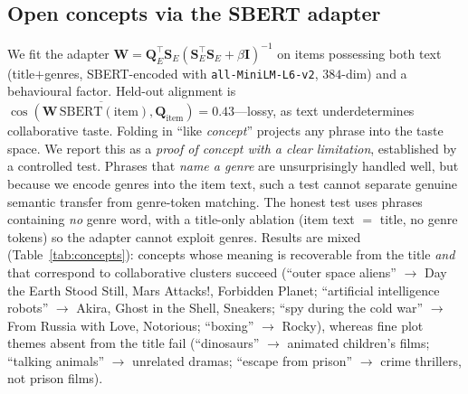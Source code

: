 \documentclass[11pt]{article}
\newcommand{\Q}{\mathbf{Q}}
\newcommand{\W}{\mathbf{W}}
\newcommand{\I}{\mathbf{I}}
\begin{document}
\subsection{Open concepts via the SBERT adapter}\label{sec:concepts}
We fit the adapter $\W=\Q_E^\top\mathbf S_E(\mathbf S_E^\top\mathbf S_E+\beta\I)^{-1}$ on items possessing both
text (title$+$genres, SBERT-encoded with \texttt{all-MiniLM-L6-v2}, $384$-dim) and a behavioural factor. Held-out
alignment is $\overline{\cos(\W\,\mathrm{SBERT}(\text{item}),\Q_{\text{item}})}=0.43$---lossy, as text
underdetermines collaborative taste. Folding in ``like \emph{concept}'' projects any phrase into the taste space.
We report this as a \emph{proof of concept with a clear limitation}, established by a controlled test. Phrases that
\emph{name a genre} are unsurprisingly handled well, but because we encode genres into the item text, such a test
cannot separate genuine semantic transfer from genre-token matching. The honest test uses phrases containing
\emph{no} genre word, with a title-only ablation (item text $=$ title, no genre tokens) so the adapter cannot
exploit genres. Results are mixed (Table~\ref{tab:concepts}): concepts whose meaning is recoverable from the title
\emph{and} that correspond to collaborative clusters succeed (``outer space aliens'' $\to$ Day the Earth Stood
Still, Mars Attacks!, Forbidden Planet; ``artificial intelligence robots'' $\to$ Akira, Ghost in the Shell,
Sneakers; ``spy during the cold war'' $\to$ From Russia with Love, Notorious; ``boxing'' $\to$ Rocky), whereas fine
plot themes absent from the title fail (``dinosaurs'' $\to$ animated children's films; ``talking animals'' $\to$
unrelated dramas; ``escape from prison'' $\to$ crime thrillers, not prison films).
\end{document}
